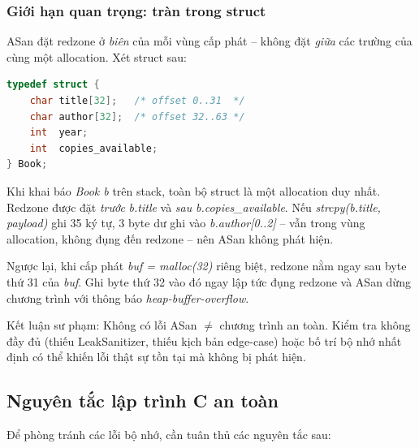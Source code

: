 \subsubsection{Giới hạn quan trọng: tràn trong struct}

ASan đặt redzone ở \emph{biên} của mỗi vùng cấp phát -- không đặt
\emph{giữa} các trường của cùng một allocation. Xét struct sau:

\begin{lstlisting}[language=C, caption={Struct Book -- hai trường liền kề trong một allocation}]
typedef struct {
    char title[32];   /* offset 0..31  */
    char author[32];  /* offset 32..63 */
    int  year;
    int  copies_available;
} Book;
\end{lstlisting}

Khi khai báo \textit{Book b} trên stack, toàn bộ struct là một allocation duy
nhất. Redzone được đặt \emph{trước} \textit{b.title} và \emph{sau}
\textit{b.copies\_available}. Nếu \textit{strcpy(b.title, payload)} ghi 35 ký
tự, 3 byte dư ghi vào \textit{b.author[0..2]} -- vẫn trong vùng allocation,
không đụng đến redzone -- nên ASan không phát hiện.

Ngược lại, khi cấp phát \textit{buf = malloc(32)} riêng biệt, redzone nằm ngay
sau byte thứ 31 của \textit{buf}. Ghi byte thứ 32 vào đó ngay lập tức đụng
redzone và ASan dừng chương trình với thông báo \textit{heap-buffer-overflow}.

Kết luận sư phạm: Không có lỗi ASan $\neq$ chương trình an toàn.
Kiểm tra không đầy đủ (thiếu LeakSanitizer, thiếu kịch bản edge-case) hoặc bố
trí bộ nhớ nhất định có thể khiến lỗi thật sự tồn tại mà không bị phát hiện.

\subsection{Nguyên tắc lập trình C an toàn}

Để phòng tránh các lỗi bộ nhớ, cần tuân thủ các nguyên tắc sau:

